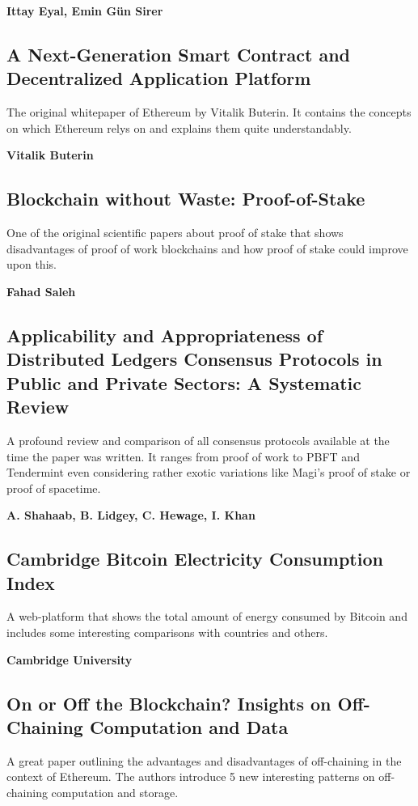 \textbf{Ittay Eyal, Emin Gün Sirer}~\cite{eyal2013}

\subsection{A Next-Generation Smart Contract and Decentralized Application Platform}
The original whitepaper of Ethereum by Vitalik Buterin. It contains the concepts on which Ethereum relys on and explains them quite understandably.

\textbf{Vitalik Buterin}~\cite{buterin2020}

\subsection{Blockchain without Waste: Proof-of-Stake}
One of the original scientific papers about proof of stake that shows disadvantages of proof of work blockchains and how proof of stake could improve upon this.

\textbf{Fahad Saleh}~\cite{proof_of_stake}

\subsection{Applicability and Appropriateness of Distributed Ledgers Consensus Protocols in Public and Private Sectors: A Systematic Review}
A profound review and comparison of all consensus protocols available at the time the paper was written. It ranges from proof of work to PBFT and Tendermint even considering rather exotic variations like Magi's proof of stake or proof of spacetime.

\textbf{A. Shahaab, B. Lidgey, C. Hewage, I. Khan}~\cite{consensus_comparison_2019}

\subsection{Cambridge Bitcoin Electricity Consumption Index}
A web-platform that shows the total amount of energy consumed by Bitcoin and includes some interesting comparisons with countries and others.

\textbf{Cambridge University}~\cite{cbeci}

\subsection{On or Off the Blockchain? Insights on Off-Chaining Computation and Data}
A great paper outlining the advantages and disadvantages of off-chaining in the context of Ethereum. The authors introduce 5 new interesting patterns on off-chaining computation and storage.


